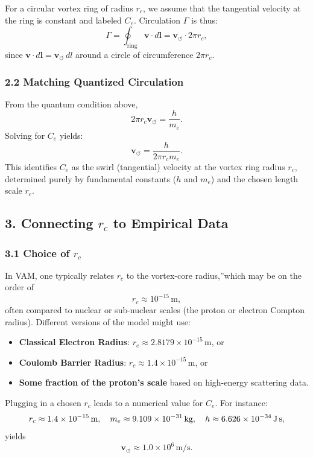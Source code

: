For a circular vortex ring of radius \(r_c\), we assume that the tangential velocity at the ring is constant and labeled \(C_e\). Circulation \(\Gamma\) is thus:
\[
    \Gamma = \oint_\text{ring} \mathbf{v} \cdot d\mathbf{l} = \mathbf{v}_{\scriptscriptstyle\boldsymbol{\circlearrowleft}} \cdot 2 \pi r_c,
\]
since \(\mathbf{v} \cdot d\mathbf{l} = \mathbf{v}_{\scriptscriptstyle\boldsymbol{\circlearrowleft}} \,dl\) around a circle of circumference \(2\pi r_c\).

\subsubsection*{2.2 Matching Quantized Circulation}

From the quantum condition above,
\[
    2 \pi r_c \mathbf{v}_{\scriptscriptstyle\boldsymbol{\circlearrowleft}} = \frac{h}{m_e}.
\]
Solving for \(C_e\) yields:
\[
    \mathbf{v}_{\scriptscriptstyle\boldsymbol{\circlearrowleft}} = \frac{h}{2 \pi r_c m_e}.
\]
This identifies \(C_e\) as the swirl (tangential) velocity at the vortex ring radius \(r_c\), determined purely by fundamental constants (\(h\) and \(m_e\)) and the chosen length scale \(r_c\).

\subsection*{3. Connecting \(r_c\) to Empirical Data}

\subsubsection*{3.1 Choice of \(r_c\)}

In VAM, one typically relates \(r_c\) to the \grqq vortex-core radius,\textquotedblright which may be on the order of
\[
    r_c \approx 10^{-15}\,\text{m},
\]
often compared to nuclear or sub-nuclear scales (the proton or electron Compton radius). Different versions of the model might use:
\begin{itemize}
    \item \textbf{Classical Electron Radius}: \(r_e \approx 2.8179 \times 10^{-15}\,\mathrm{m}\), or
    \item \textbf{Coulomb Barrier Radius}: \(r_c \approx 1.4 \times 10^{-15}\,\mathrm{m}\), or
    \item \textbf{Some fraction of the proton's scale} based on high-energy scattering data.
\end{itemize}

Plugging in a chosen \(r_c\) leads to a numerical value for \(C_e\). For instance:
\[
    r_c \approx 1.4 \times 10^{-15}\,\text{m}, \quad m_e \approx 9.109 \times 10^{-31}\,\text{kg}, \quad h \approx 6.626 \times 10^{-34}\,\text{J\,s},
\]
yields
\[
    \mathbf{v}_{\scriptscriptstyle\boldsymbol{\circlearrowleft}} \approx 1.0 \times 10^6 \,\text{m/s}.
\]

